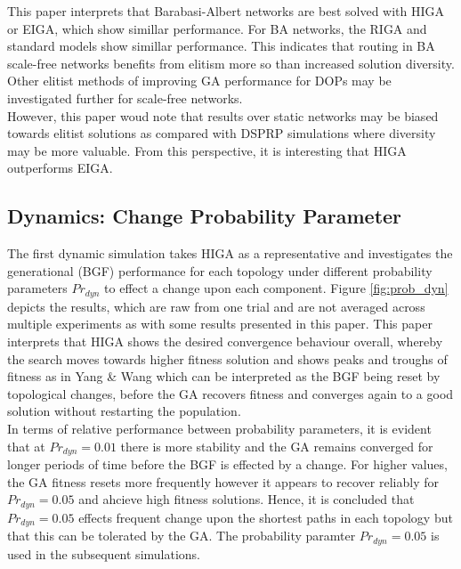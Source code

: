 \documentclass[
	a4paper, %
	10pt, %
	unnumberedsections, %
	twoside, %
]{LTJournalArticle}
\begin{document}
This paper interprets that Barabasi-Albert networks are best solved with HIGA or EIGA, which show simillar performance. For BA networks, the RIGA and standard models show simillar performance. This indicates that routing in BA scale-free networks benefits from elitism more so than increased solution diversity. Other elitist methods of improving GA performance for DOPs may be investigated further for scale-free networks. \\

However, this paper woud note that results over static networks may be biased towards elitist solutions as compared with DSPRP simulations where diversity may be more valuable. From this perspective, it is interesting that HIGA outperforms EIGA. \\ 

\subsection{Dynamics: Change Probability Parameter} 

The first dynamic simulation takes HIGA as a representative and investigates the generational (BGF) performance for each topology under different probability parameters \(Pr_{dyn}\) to effect a change upon each component. Figure \ref{fig:prob_dyn} depicts the results, which are raw from one trial and are not averaged across multiple experiments as with some results presented in this paper. This paper interprets that HIGA shows the desired convergence behaviour overall, whereby the search moves towards higher fitness solution and shows peaks and troughs of fitness as in Yang \& Wang \cite{yang:10} which can be interpreted as the BGF being reset by topological changes, before the GA recovers fitness and converges again to a good solution without restarting the population. \\

In terms of relative performance between probability parameters, it is evident that at \(Pr_{dyn} = 0.01\) there is more stability and the GA remains converged for longer periods of time before the BGF is effected by a change. For higher values, the GA fitness resets more frequently however it appears to recover reliably for \(Pr_{dyn} = 0.05\) and ahcieve high fitness solutions. Hence, it is concluded that \(Pr_{dyn} = 0.05\) effects frequent change upon the shortest paths in each topology but that this can be tolerated by the GA. The probability paramter \(Pr_{dyn} = 0.05\) is used in the subsequent simulations.  
\end{document}
